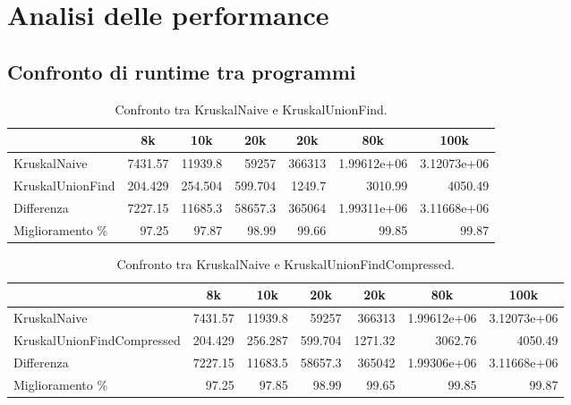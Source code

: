 \section{Analisi delle performance}
\label{cap:performance-analysis}

\subsection{Confronto di runtime tra programmi}

\begin{table}[h!]
\centering
    \begin{tabular}{|l|rrrrrr|}
    \hline
    &  \multicolumn{1}{c}{8k} & \multicolumn{1}{c}{10k} & \multicolumn{1}{c}{20k} & \multicolumn{1}{c}{20k} & \multicolumn{1}{c}{80k} &           \multicolumn{1}{c|}{100k} \\
    \hline
     KruskalNaive     & 7431.57  & 11939.8   & 59257     & 366313    &    1.99612e+06 &    3.12073e+06 \\
     KruskalUnionFind &  204.429 &   254.504 &   599.704 &   1249.7  & 3010.99        & 4050.49        \\ \hline 
     Differenza       & 7227.15  & 11685.3   & 58657.3   & 365064    &    1.99311e+06 &    3.11668e+06 \\
     Miglioramento \%    &   97.25  &    97.87  &    98.99  &     99.66 &   99.85        &   99.87        \\
    \hline
    \end{tabular}
    \caption{Confronto tra KruskalNaive e KruskalUnionFind.}
    \label{table:kruskal-naive-vs-kruskal-union-find}
\end{table}


\begin{table}[h!]
\centering
    \hspace*{-1cm}
    \begin{tabular}{|l|rrrrrr|}
    \hline
    &  \multicolumn{1}{c}{8k} & \multicolumn{1}{c}{10k} & \multicolumn{1}{c}{20k} & \multicolumn{1}{c}{20k} & \multicolumn{1}{c}{80k} &           \multicolumn{1}{c|}{100k} \\
    \hline
     KruskalNaive               & 7431.57  & 11939.8   & 59257     & 366313    &    1.99612e+06 &    3.12073e+06 \\
     KruskalUnionFindCompressed &  204.429 &   256.287 &   599.704 &   1271.32 & 3062.76        & 4050.49        \\ \hline 
     Differenza                 & 7227.15  & 11683.5   & 58657.3   & 365042    &    1.99306e+06 &    3.11668e+06 \\
     Miglioramento \%              &   97.25  &    97.85  &    98.99  &     99.65 &   99.85        &   99.87        \\
    \hline
    \end{tabular}
    \caption{Confronto tra KruskalNaive e KruskalUnionFindCompressed.}
    \label{table:kruskal-naive-vs-kruskal-union-find-compressed}
\end{table}
   
